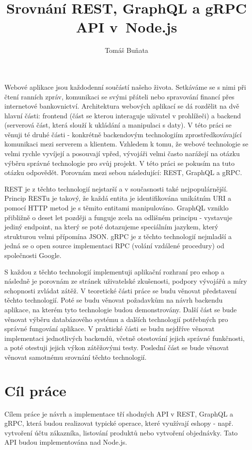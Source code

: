 \documentclass[thesis=M,czech]{FITthesis}[2019/12/23]
\title{Srovnání REST, GraphQL a gRPC API v~Node.js}
\author{Tomáš Buňata} %
\begin{document}

\begin{introduction}
Webové aplikace jsou každodenní součástí našeho života. Setkáváme se s nimi při čtení ranních zpráv, komunikaci se svými přáteli nebo spravování financí přes internetové bankovnictví.
Architektura webových aplikací se dá rozdělit na dvě hlavní části: frontend (část se kterou interaguje uživatel v prohlížeči) a backend (serverová část, která slouží k ukládání a  manipulaci s daty). V této práci se věnuji té druhé části - konkrétně backendovým technologiím zprostředkovávající komunikaci mezi serverem a klientem.
Vzhledem k tomu, že webové technologie se velmi rychle vyvíjejí a posouvají vpřed, vývojáři velmi často narážejí na otázku výběru správné technologie pro svůj projekt. V této práci se pokusím na tuto otázku odpovědět. Porovnám mezi sebou následující: REST, GraphQL a gRPC.

REST je z těchto technologií nejstarší a v současnosti také nejpopulárnější. Princip RESTu je takový, že každá entita je identifikována unikátním URI a pomocí HTTP metod je s těmito entitami manipulováno.
GraphQL vzniklo přibližně o deset let později a funguje zcela na odlišném principu - vystavuje jediný endpoint, na který se poté dotazujeme speciálním jazykem, který strukturou velmi přípomína JSON.
gRPC je z těchto technologií nejmladší a jedná se o open source implementaci RPC (volání vzdálené procedury) od společnosti Google.

S každou z těchto technologií implementuji aplikační rozhraní pro eshop a následně je porovnám ze stránek uživatelské zkušenosti, podpory vývojářů a míry schopnosti zvládat zátěž.
V teoretické části práce se budu věnovat představení těchto technologií. Poté se budu věnovat požadavkům na návrh backendu aplikace, na kterém tyto technologie budou demonstrovány. Další část se bude věnovat výběru databázového systému a dalších technologií potřebných pro správné fungování aplikace.
V praktické části se budu nejdříve věnovat implementaci jednotlivých backendů, včetně otestování jejich správné funkčnosti, a poté otestuji jejich výkon zátěžovými testy. Poslední část se bude věnovat věnovat samotnému srovnání těchto technologií.

\end{introduction}

\chapter{Cíl práce}
Cílem práce je návrh a implementace  tří shodných API v REST, GraphQL a gRPC, která budou realizovat typické operace, které využívají eshopy - např. vytvoření účtu zákazníka, listování produktů nebo vytvoření objednávky. Tato API budou implementována nad Node.js.
\end{document}
